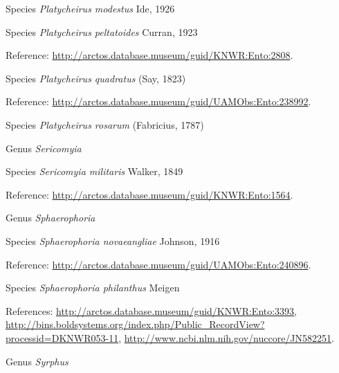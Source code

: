 \documentclass[9pt, article]{memoir}
\begin{document}
\begin{multicols}{2}
\vspace{6pt}\noindent\hspace{36pt}Species \textit{Platycheirus modestus} Ide, 1926


\vspace{6pt}\noindent\hspace{36pt}Species \textit{Platycheirus peltatoides} Curran, 1923


Reference: 
\url{http://arctos.database.museum/guid/KNWR:Ento:2808}.

\vspace{6pt}\noindent\hspace{36pt}Species \textit{Platycheirus quadratus} (Say, 1823)


Reference: 
\url{http://arctos.database.museum/guid/UAMObs:Ento:238992}.

\vspace{6pt}\noindent\hspace{36pt}Species \textit{Platycheirus rosarum} (Fabricius, 1787)


\vspace{6pt}\noindent\hspace{30pt}Genus \textit{Sericomyia}


\vspace{6pt}\noindent\hspace{36pt}Species \textit{Sericomyia militaris} Walker, 1849


Reference: 
\url{http://arctos.database.museum/guid/KNWR:Ento:1564}.

\vspace{6pt}\noindent\hspace{30pt}Genus \textit{Sphaerophoria}


\vspace{6pt}\noindent\hspace{36pt}Species \textit{Sphaerophoria novaeangliae} Johnson, 1916


Reference: 
\url{http://arctos.database.museum/guid/UAMObs:Ento:240896}.

\vspace{6pt}\noindent\hspace{36pt}Species \textit{Sphaerophoria philanthus} Meigen


References: 
\url{http://arctos.database.museum/guid/KNWR:Ento:3393}, 
\url{http://bins.boldsystems.org/index.php/Public_RecordView?processid=DKNWR053-11}, 
\url{http://www.ncbi.nlm.nih.gov/nuccore/JN582251}.

\vspace{6pt}\noindent\hspace{30pt}Genus \textit{Syrphus}



\end{multicols}
\end{document}
